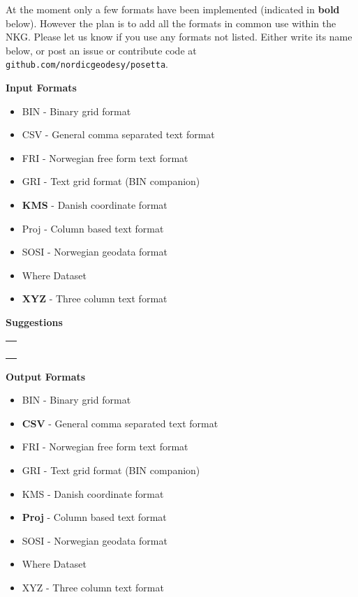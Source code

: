 At the moment only a few formats have been implemented (indicated in \textbf{bold} below). However the plan is to add all the formats in common use within the NKG.  Please let us know if you use any formats not listed. Either write its name below, or post an issue or contribute code at \texttt{github.com/nordicgeodesy/posetta}.

\begin{multicols}{2}
  \textbf{Input Formats}
  
  \begin{itemize}
  \item BIN - Binary grid format
  \item CSV - General comma separated text format
  \item FRI - Norwegian free form text format
  \item GRI - Text grid format (BIN companion)
  \item \textbf{KMS} - Danish coordinate format
  \item Proj - Column based text format
  \item SOSI - Norwegian geodata format
  \item Where Dataset
  \item \textbf{XYZ} - Three column text format
  \end{itemize}

  \textbf{Suggestions}
  \begin{center}
    \begin{tabularx}{0.8\columnwidth}{l}
    \hline \\
    \hline \\
    \hline \\
    \hline \\
    \hline \\
    \end{tabularx}
  \end{center}
  \vspace*{-1.5cm}  %

  \columnbreak
  \textbf{Output Formats}
  
  \begin{itemize}
  \item BIN - Binary grid format
  \item \textbf{CSV} - General comma separated text format
  \item FRI - Norwegian free form text format
  \item GRI - Text grid format (BIN companion)
  \item KMS - Danish coordinate format
  \item \textbf{Proj} - Column based text format
  \item SOSI - Norwegian geodata format
  \item Where Dataset
  \item XYZ - Three column text format
  \end{itemize}


\end{multicols}

